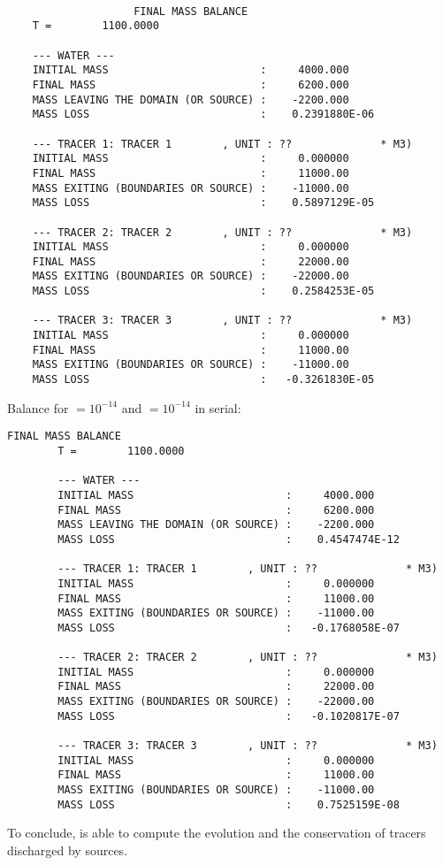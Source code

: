 \begin{lstlisting}[language=TelFortran]

	                FINAL MASS BALANCE
	T =        1100.0000

	--- WATER ---
	INITIAL MASS                        :     4000.000
	FINAL MASS                          :     6200.000
	MASS LEAVING THE DOMAIN (OR SOURCE) :    -2200.000
	MASS LOSS                           :    0.2391880E-06

	--- TRACER 1: TRACER 1        , UNIT : ??              * M3)
	INITIAL MASS                        :     0.000000
	FINAL MASS                          :     11000.00
	MASS EXITING (BOUNDARIES OR SOURCE) :    -11000.00
	MASS LOSS                           :    0.5897129E-05

	--- TRACER 2: TRACER 2        , UNIT : ??              * M3)
	INITIAL MASS                        :     0.000000
	FINAL MASS                          :     22000.00
	MASS EXITING (BOUNDARIES OR SOURCE) :    -22000.00
	MASS LOSS                           :    0.2584253E-05

	--- TRACER 3: TRACER 3        , UNIT : ??              * M3)
	INITIAL MASS                        :     0.000000
	FINAL MASS                          :     11000.00
	MASS EXITING (BOUNDARIES OR SOURCE) :    -11000.00
	MASS LOSS                           :   -0.3261830E-05
\end{lstlisting}

\bigskip
Balance for  $= 10^{-14}$ and
 $= 10^{-14}$ in serial:

\begin{lstlisting}[language=TelFortran]
                        FINAL MASS BALANCE
        T =        1100.0000

        --- WATER ---
        INITIAL MASS                        :     4000.000
        FINAL MASS                          :     6200.000
        MASS LEAVING THE DOMAIN (OR SOURCE) :    -2200.000
        MASS LOSS                           :    0.4547474E-12

        --- TRACER 1: TRACER 1        , UNIT : ??              * M3)
        INITIAL MASS                        :     0.000000
        FINAL MASS                          :     11000.00
        MASS EXITING (BOUNDARIES OR SOURCE) :    -11000.00
        MASS LOSS                           :   -0.1768058E-07

        --- TRACER 2: TRACER 2        , UNIT : ??              * M3)
        INITIAL MASS                        :     0.000000
        FINAL MASS                          :     22000.00
        MASS EXITING (BOUNDARIES OR SOURCE) :    -22000.00
        MASS LOSS                           :   -0.1020817E-07

        --- TRACER 3: TRACER 3        , UNIT : ??              * M3)
        INITIAL MASS                        :     0.000000
        FINAL MASS                          :     11000.00
        MASS EXITING (BOUNDARIES OR SOURCE) :    -11000.00
        MASS LOSS                           :    0.7525159E-08
\end{lstlisting}


\bigskip
To conclude,  is able to compute the evolution and the conservation of
tracers discharged by sources.
